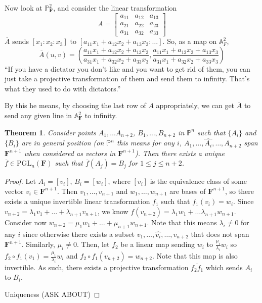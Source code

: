 \documentclass[12pt]{article}
\newcommand{\F}{\mathbf{F}}
\renewcommand{\P}{\mathbb{P}}
\newcommand{\A}{\mathbb{A}}
\newcommand{\PGL}{\mathrm{PGL}}
\newtheorem{theorem}{Theorem}[section]
\begin{document}
    Now look at $\P_\F^2$, and consider the linear transformation 
    $$A = \begin{bmatrix}
        a_{11} & a_{12} & a_{13} \\
        a_{21} & a_{22} & a_{23} \\
        a_{31} & a_{32} & a_{33}
    \end{bmatrix}$$
    $\overline{A}$ sends $[x_1: x_2: x_3]$ to $[a_{11}x_1 + a_{12}x_2 + a_{13}x_3: \dots]$. So, as a map on $\A_F^2$, 
    $$\overline{A}(u, v) =  \left( \frac{a_{11}x_1 + a_{12}x_2 + a_{13}x_3}{a_{31}x_1 + a_{32}x_2 + a_{33}x_3}, \frac{a_{11}x_1 + a_{12}x_2 + a_{13}x_3}{a_{31}x_1 + a_{32}x_2 + a_{33}x_3}\right)$$
    ``If you have a dictator you don't like and you want to get rid of them, you can just take a projective transformation of them and send them to infinity. That's what they used to do with dictators.'' \par
    By this he means, by choosing the last row of $A$ appropriately, we can get $\overline{A}$ to send any given line in $\A_\F^2$ to infinity. 
    \begin{theorem}
        Consider points $A_1, \dots A_{n+2}$, $B_1, \dots, B_{n+2}$ in $\P^n$ such that $\{A_i\}$ and $\{B_i\}$ are in \textit{general position} (on $\P^n$ this means for any $i$, $A_1, \dots, \hat{A_i}, \dots, A_{n+2}$ span $\F^{n+1}$ when considered as vectors in $\F^{n+1}$). Then there exists a unique $\overline{f} \in \PGL_n(\F)$ such that $\overline{f}(A_j) = B_j$ for $1 \leq j \leq n+2$. 
    \end{theorem}
    \begin{proof}
        Let $A_i = [v_i]$, $B_i = [w_i]$, where $[v_i]$ is the equivalence class of some vector $v_i \in \F^{n+1}$. Then $v_1, \dots, v_{n+1}$ and $w_1, \dots, w_{n+1}$ are bases of $\F^{n+1}$, so there exists a unique invertible linear transformation $f_1$ such that $f_1(v_i) = w_i$. Since $v_{n+2} = \lambda_1v_1 + \dots + \lambda_{n+1}v_{n+1}$, we know $f(v_{n+2}) = \lambda_1w_1 + \dots \lambda_{n+1}w_{n+1}$. Consider now $w_{n+2} = \mu_1w_1 + \dots + \mu_{n+1}w_{n+1}$. Note that this means $\lambda_i \neq 0$ for any $i$ since otherwise there exists a subset $v_1, \dots, \hat{v_i}, \dots, v_{n+2}$ that does not span $\F^{n+1}$. Similarly, $\mu_i \neq 0$. Then, let $f_2$ be a linear map sending $w_i$ to $\frac{\mu_i}{\lambda_i}w_i$ so $f_2 \circ f_1(v_1) = \frac{\mu_1}{\lambda_i}w_i$ and $f_2 \circ f_1(v_{n+2}) = w_{n+2}$. Note that this map is also invertible. As such, there exists a projective transformation $\overline{f_2f_1}$ which sends $A_i$ to $B_i$. \par 
        Uniqueness (ASK ABOUT)  
    \end{proof}
\end{document}
